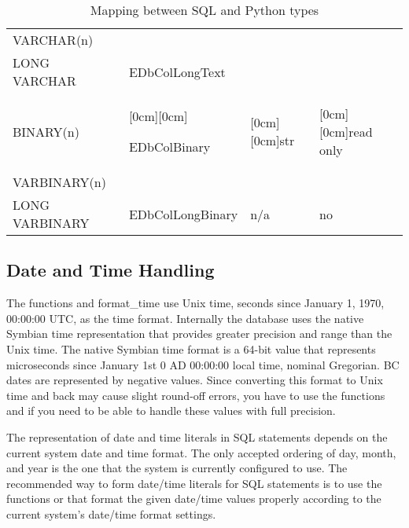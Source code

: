 \begin{table}[htbp]
\begin{center}
\begin{tabular}{|p{117pt}|p{144pt}|p{99pt}|p{63pt}|}
\cline{1-1} 
\textsf{VARCHAR(n)}& 
 & 
 & 
  \\
\cline{1-2} 
\textsf{LONG VARCHAR}& 
\textsf{EDbColLongText}& 
 & 
  \\
\hline
\textsf{BINARY(n)}& 
\raisebox{-1.50ex}[0cm][0cm]{\textsf{EDbColBinary} \par \textsf{}}& 
\raisebox{-1.50ex}[0cm][0cm]{str}& 
\raisebox{-1.50ex}[0cm][0cm]{read only} \\
\cline{1-1} 
\textsf{VARBINARY(n)}& 
 & 
 & 
  \\
\hline
\textsf{LONG VARBINARY}& 
\textsf{EDbColLongBinary}& 
n/a& 
no \\
\hline
\end{tabular}
\caption{Mapping between SQL and Python types}
\label{tab:sqltypes}
\end{center}
\end{table}


\subsection{Date and Time Handling}
\label{subsec:mylabel15}
The functions  and \textsf{format_time} use Unix time, 
seconds since January 1, 1970, 00:00:00 UTC, as the time format. Internally 
the database uses the native Symbian time representation that provides 
greater precision and range than the Unix time. The native Symbian time 
format is a 64-bit value that represents microseconds since January 1st 0 AD 
00:00:00 local time, nominal Gregorian. BC dates are represented by negative 
values. Since converting this format to Unix time and back may cause slight 
round-off errors, you have to use the functions  and 
 if you need to be able to handle these values 
with full precision.

The representation of date and time literals in SQL statements depends
on the current system date and time format. The only accepted ordering
of day, month, and year is the one that the system is currently
configured to use. The recommended way to form date/time literals for
SQL statements is to use the functions  or
 that format the given date/time values
properly according to the current system's date/time format settings.
